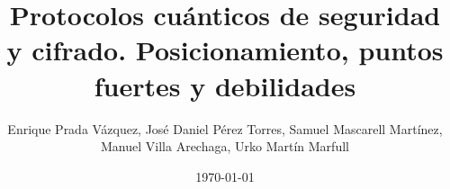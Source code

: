 \documentclass[11pt,a4paper,spanish]{book}
\title{Protocolos cuánticos de seguridad y cifrado. Posicionamiento, puntos fuertes y debilidades}
\author{Enrique Prada Vázquez, José Daniel Pérez Torres, Samuel Mascarell Martínez, Manuel Villa Arechaga, Urko Martín Marfull}
\date{\today}
\begin{document}
\renewcommand{\listfigurename}{Índice de figuras}
\renewcommand{\listtablename}{Índice de tablas}
\renewcommand{\contentsname}{Índice de contenidos}
\renewcommand{\figurename}{Figura}
\renewcommand{\tablename}{Tabla}

\maketitle
\frontmatter
\tableofcontents
\listoftables




\mainmatter








\end{document}
